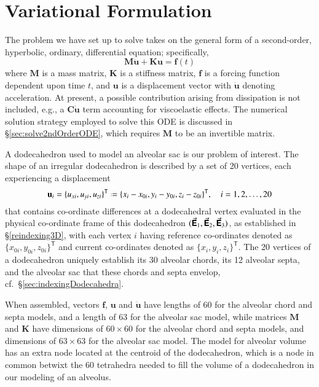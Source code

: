 \setcounter{section}{0}
\part{Variational Formulation}
\label{partVariational}

The problem we have set up to solve takes on the general form of a second-order, hyperbolic, ordinary, differential equation; specifically,
\begin{equation}
\mathbf{M} \ddot{\mathbf{u}} + \mathbf{K} \mathbf{u} = \mathbf{f}(t)
\end{equation}
where $\mathbf{M}$ is a mass matrix, $\mathbf{K}$ is a stiffness matrix, $\mathbf{f}$ is a forcing function dependent upon time $t$, and $\mathbf{u}$ is a displacement vector with $\ddot{\mathbf{u}}$ denoting acceleration.  At present, a possible contribution arising from dissipation is not included, e.g., a $\mathbf{C} \dot{\mathbf{u}}$ term accounting for visco\-elastic effects.  The numerical solution strategy employed to solve this ODE is discussed in \S\ref{sec:solve2ndOrderODE}, which requires $\mathbf{M}$ to be an invertible matrix.

A dodecahedron used to model an alveolar sac is our problem of interest.  The shape of an irregular dodecahedron is described by a set of 20 vertices, each experiencing a displacement
\begin{equation}
\mathbf{u}_i = \{ u_{xi} , u_{yi} , u_{zi} \}^{\mathsf{T}} \defeq
\{ x_i - x_{0i} , y_i - y_{0i} , z_i - z_{0i} \}^{\mathsf{T}} ,
\quad i = 1, 2, \ldots , 20
\end{equation}
that contains co-ordinate differences at a dodecahedral vertex evaluated in the physical co-ordinate frame of this dodecahedron $( \vec{\boldsymbol{\mathsf{E}}}_1 , \vec{\boldsymbol{\mathsf{E}}}_2 , \vec{\boldsymbol{\mathsf{E}}}_3 )$, as established in \S\ref{reindexing3D}, with each vertex $i$ having reference co-ordinates denoted as $\{ x_{0i} , y_{0i} , z_{0i} \}^{\mathsf{T}}$ and current co-ordinates denoted as $\{ x_i , y_i , z_i \}^{\mathsf{T}}$.  The 20 vertices of a dodecahedron uniquely establish its 30 alveolar chords, its 12 alveolar septa, and the alveolar sac that these chords and septa envelop, cf.\ \S\ref{sec:indexingDodecahedra}.

When assembled, vectors $\mathbf{f}$, $\mathbf{u}$ and $\ddot{\mathbf{u}}$ have lengths of 60 for the alveolar chord and septa models, and a length of 63 for the alveolar sac model, while matrices $\mathbf{M}$ and $\mathbf{K}$ have dimensions of $60 \! \times \! 60$ for the alveolar chord and septa models, and dimensions of $63 \! \times \! 63$ for the alveolar sac model.  The model for alveolar volume has an extra node located at the centroid of the dodecahedron, which is a node in common betwixt the 60 tetrahedra needed to fill the volume of a dodecahedron in our modeling of an alveolus. 

